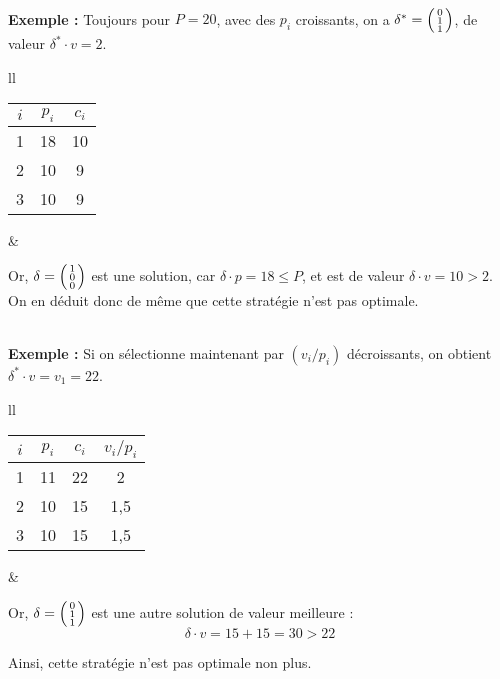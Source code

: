 \documentclass{article}
\newcommand{\elt}[1]{\textbf{#1}}
\newcommand{\dotp}{\! \cdot \!}
\newcommand{\nl}{\\[5mm]}
\newcommand{\1}{\bbm{1}}
\begin{document}
				\nl
			\elt{Exemple :} Toujours pour $P = 20$, avec des $p_i$ croissants, on a \( \delta^* = \begin{psmallmatrix} 0 \\ 1 \\ 1 \end{psmallmatrix} \), de valeur $\delta^* \! \dotp v = 2$.
			\\[-3mm]
				\begin{tabular}[t]{ll}
					\begin{tabular}[t]{| c | c | c |}
						\hline
						$i$ & $p_i$ & $c_i$ \\ \hline
						1 & 18 & 10 \\ \hline
						2 & 10 & 9 \\ \hline
						3 & 10 & 9 \\ \hline
					\end{tabular}
					&
					\parbox[t]{140mm}{
						\vspace{1mm}
						Or, \( \delta = \begin{psmallmatrix} 1 \\ 0 \\ 0 \end{psmallmatrix} \) est une solution, car \( \delta \dotp p = 18 \leq P \), et est de valeur \( \delta \dotp v = 10 > 2 \).
							\\[2mm]
						On en déduit donc de même que cette stratégie n'est pas optimale.
						\hspace{-8mm}
					}
				\end{tabular}
				\nl
			\elt{Exemple :} Si on sélectionne maintenant par $(v_i / p_i)$ décroissants, on obtient $\delta^* \! \dotp v = v_1 = 22$.
			\\[-1mm]
			\begin{tabular}[t]{ll}
				\begin{tabular}[t]{| c | c | c | c |}
					\hline
					$i$ & $p_i$ & $c_i$ & $v_i/p_i$\\ \hline
					1 & 11 & 22 & 2\\ \hline
					2 & 10 & 15 & 1,5 \\ \hline
					3 & 10 & 15 & 1,5 \\ \hline
				\end{tabular}
				&
				\parbox[t]{130mm}{
					\vspace{1mm}
					Or, \( \delta = \begin{psmallmatrix} 0 \\ 1 \\ 1 \end{psmallmatrix} \) est une autre solution de valeur meilleure :
						\vspace{-5mm}
						\[ \delta \dotp v = 15 + 15 = 30 > 22 \]
						
					\vspace{-3mm}
					Ainsi, cette stratégie n'est pas optimale non plus.
				}
			\end{tabular}
\end{document}
